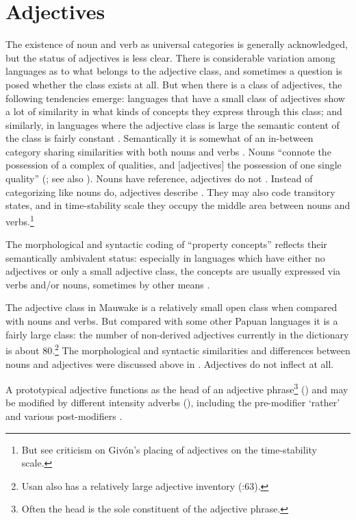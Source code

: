\section{Adjectives}\label{sec:3.3}
{}
The existence of noun and verb as universal categories is generally acknowledged, but the status of adjectives is less clear. There is considerable variation among languages as to what belongs to the adjective class, and sometimes a question is posed whether the class exists at all. But when there is a class of adjectives, the following tendencies emerge: languages that have a small class of adjectives show a lot of similarity in what kinds of concepts they express through this class; and similarly, in languages where the adjective class is large the semantic content of the class is fairly constant \citep[20]{Dixon1977}. Semantically it is somewhat of an in-between category sharing similarities with both nouns and verbs \citep[447]{Lyons1977}. Nouns ``connote the possession of a complex of qualities, and [adjectives] the possession of one single quality'' (\citealt[81]{Jespersen1924}; see also \citealt[362]{Wierzbicka1986}). Nouns have reference, adjectives do not \citep[77]{HakulinenEtAl1979}%
. Instead of categorizing like nouns do, adjectives describe \citep[357]{Wierzbicka1986}. They may also code transitory states, and in  time-stability scale they occupy the middle area between nouns and verbs.\footnote{But see  criticism on Giv\'on's placing of adjectives on the time-stability scale.} 

The morphological and syntactic coding of ``property concepts'' reflects their semantically ambivalent status: especially in languages which have either no adjectives or only a small adjective class, the concepts are usually expressed via verbs and/or nouns, sometimes by other means \citep[20]{Dixon1977}.

The adjective class in Mauwake is a relatively small open class when compared with nouns and verbs. But compared with some other Papuan languages \citep[50--51]{Dixon1977} it is a fairly large class: the number of non-derived adjectives currently in the dictionary is about 80.\footnote{Usan also has a relatively large adjective inventory (:63).} The morphological and syntactic similarities and differences between nouns and adjectives were discussed above in . Adjectives do not inflect at all. 

A prototypical adjective functions as the head of an adjective phrase\footnote{Often the head is the sole constituent of the adjective phrase.} () and may be modified by different intensity adverbs (), including the pre-modifier  `rather'  and various post-modifiers . 

